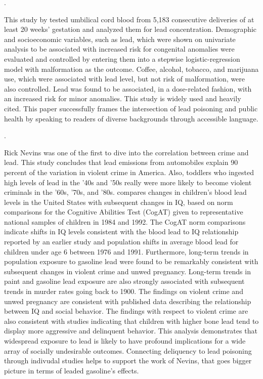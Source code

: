 \documentclass{article}\usepackage[]{graphicx}\usepackage[]{color}
\begin{document}
{\noindent {}. 

This study by \cite{needleman_1984} tested umbilical cord blood from 5,183 consecutive deliveries of at least 20 weeks' gestation and analyzed them for lead concentration. Demographic and socioeconomic variables, such as lead, which were shown on univariate analysis to be associated with increased risk for congenital anomalies were evaluated and controlled by entering them into a stepwise logistic-regression model with malformation as the outcome. Coffee, alcohol, tobacco, and marijuana use, which were associated with lead level, but not risk of malformation, were also controlled. Lead was found to be associated, in a dose-related fashion, with an increased risk for minor anomalies. This study is widely used and heavily cited. This paper successfully frames the intersection of lead poisoning and public health by speaking to readers of diverse backgrounds through accessible language.

\noindent {}.

Rick Nevins was one of the first to dive into the correlation between crime and lead. This study concludes that lead emissions from automobiles explain 90 percent of the variation in violent crime in America. Also, toddlers who ingested high levels of lead in the '40s and '50s really were more likely to become violent criminals in the '60s, '70s, and '80s. \cite{nevin_2000} compares changes in children’s blood lead levels in the United States with subsequent changes in IQ, based on norm comparisons for the Cognitive Abilities Test (CogAT) given to representative national samples of children in 1984 and 1992. The CogAT norm comparisons indicate shifts in IQ levels consistent with the blood lead to IQ relationship reported by an earlier study and population shifts in average blood lead for children under age 6 between 1976 and 1991. Furthermore, long-term trends in population exposure to gasoline lead were found to be remarkably consistent with subsequent changes in violent crime and unwed pregnancy. Long-term trends in paint and gasoline lead exposure are also strongly associated with subsequent trends in murder rates going back to 1900. The findings on violent crime and unwed pregnancy are consistent with published data describing the relationship between IQ and social behavior. The findings with respect to violent crime are also consistent with studies indicating that children with higher bone lead tend to display more aggressive and delinquent behavior. This analysis demonstrates that widespread exposure to lead is likely to have profound implications for a wide array of socially undesirable outcomes. Connecting deliquency to lead poisoning through indivudal studies helps to support the work of Nevins, that goes bigger picture in terms of leaded gasoline's effects. 

}
\end{document}
